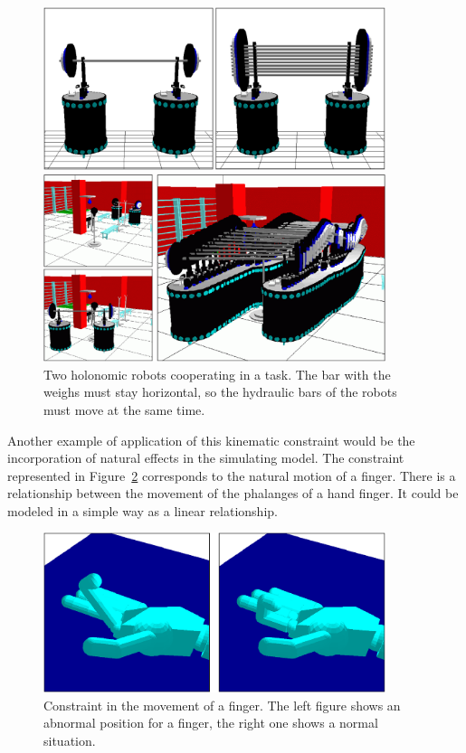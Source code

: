 \begin{figure}[ht!]
\centerline{
\includegraphics[width=10cm]{FIG/Constraint/halteres.eps}
}
\centerline{
\includegraphics[width=10cm]{FIG/Constraint/halteres2.eps}
}
\caption{\label{fig:halteres} Two holonomic robots cooperating in a
task. The bar with the weighs must stay horizontal, so the hydraulic
bars of the robots must move at the same time.}
\end{figure}


Another example of application of this kinematic constraint would be
the incorporation of natural effects in the simulating model. The
constraint represented in Figure~\ref{fig:dedos} corresponds to the
natural motion of a finger. There is a relationship between the
movement of the phalanges of a hand finger. It could be modeled in a
simple way as a linear relationship.

\begin{figure}[ht!]
\begin{center}
  \includegraphics[width=10.0cm]{FIG/Constraint/dedos.eps}
\end{center}
\caption{\label{fig:dedos} Constraint in the movement of a finger. The 
left figure shows an abnormal position for a finger, the right one shows a 
normal situation.}
\end{figure}


